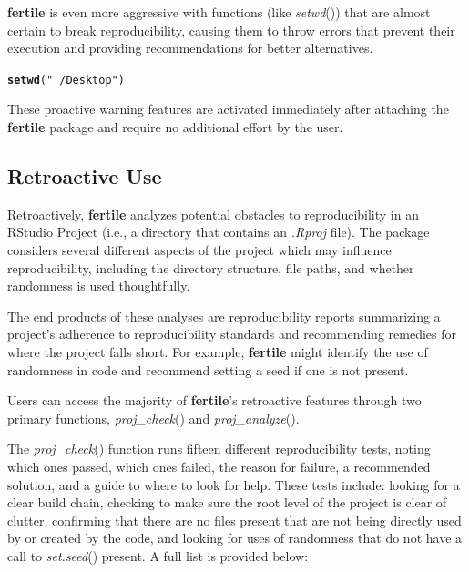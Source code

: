 \documentclass[APA,LATO1COL]{WileyNJD-v2}\usepackage[]{graphicx}\usepackage[]{color}
\makeatletter
\newcommand{\hlstr}[1]{\textcolor[rgb]{0.192,0.494,0.8}{#1}}%
\newcommand{\hlstd}[1]{\textcolor[rgb]{0.345,0.345,0.345}{#1}}%
\newcommand{\hlkwd}[1]{\textcolor[rgb]{0.737,0.353,0.396}{\textbf{#1}}}%
\newenvironment{kframe}{%
 \def\at@end@of@kframe{}%
 \ifinner\ifhmode%
  \def\at@end@of@kframe{\end{minipage}}%
  \begin{minipage}{\columnwidth}%
 \fi\fi%
 \def\FrameCommand##1{\hskip\@totalleftmargin \hskip-\fboxsep
 \colorbox{shadecolor}{##1}\hskip-\fboxsep
     \hskip-\linewidth \hskip-\@totalleftmargin \hskip\columnwidth}%
 \MakeFramed {\advance\hsize-\width
   \@totalleftmargin\z@ \linewidth\hsize
   \@setminipage}}%
 {\par\unskip\endMakeFramed%
 \at@end@of@kframe}
\newenvironment{knitrout}{}{} %
\newcommand{\cmd}[1]{\textit{#1}}
\newcommand{\pkg}[1]{\textbf{#1}}
\newcommand{\func}[1]{\textit{#1}()}
\makeatother
\begin{document}
\pkg{fertile} is even more aggressive with functions (like \func{setwd}) that are almost certain to break reproducibility, causing them to throw errors that prevent their execution and providing recommendations for better alternatives.

\begin{knitrout}
\color{fgcolor}\begin{kframe}
\begin{alltt}
\hlkwd{setwd}\hlstd{(}\hlstr{"~/Desktop"}\hlstd{)}
\end{alltt}


{\ttfamily\noindent\bfseries\color{errorcolor}{\#\# Error: setwd() is likely to break reproducibility. Use here::here() instead.}}\end{kframe}
\end{knitrout}

These proactive warning features are activated immediately after attaching the \pkg{fertile} package and require no additional effort by the user.

\subsection{Retroactive Use}

Retroactively, \pkg{fertile} analyzes potential obstacles to reproducibility in an RStudio Project (i.e., a directory that contains an \cmd{.Rproj} file). The package considers several different aspects of the project which may influence reproducibility, including the directory structure, file paths, and whether randomness is used thoughtfully.

The end products of these analyses are reproducibility reports summarizing a project's adherence to reproducibility standards and recommending remedies for where the project falls short. For example, \pkg{fertile} might identify the use of randomness in code and recommend setting a seed if one is not present.

Users can access the majority of \pkg{fertile}'s retroactive features through two primary functions, \func{proj\_check} and \func{proj\_analyze}. 

The \func{proj\_check} function runs fifteen different reproducibility tests, noting which ones passed, which ones failed, the reason for failure, a recommended solution, and a guide to where to look for help. These tests include: looking for a clear build chain, checking to make sure the root level of the project is clear of clutter, confirming that there are no files present that are not being directly used by or created by the code, and looking for uses of randomness that do not have a call to \func{set.seed} present. A full list is provided below:
\end{document}
